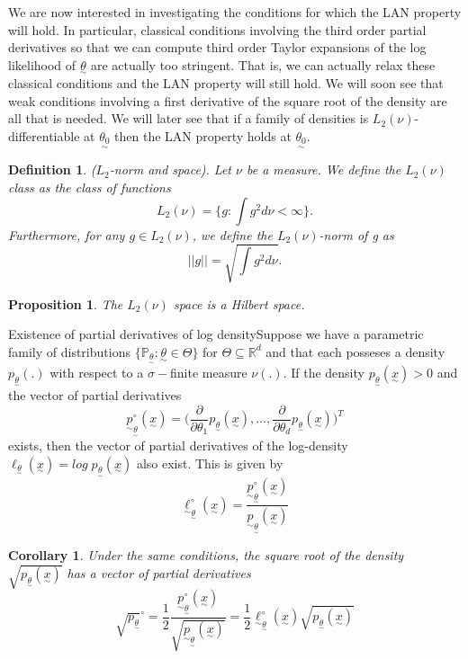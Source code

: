 \documentclass[twoside]{article}
\newtheorem{proposition}[theorem]{Proposition}
\newtheorem{corollary}[theorem]{Corollary}
\newtheorem{definition}[theorem]{Definition}
\newcommand{\prob}{\mathbb{P}}
\newcommand{\utilde}{\underset{\sim}}
\begin{document}
We are now interested in investigating the conditions for which the LAN property will hold. In particular, classical conditions involving the third order partial derivatives so that we can compute third order Taylor expansions of the log likelihood of $\utilde{\theta}$ are actually too stringent. That is, we can actually relax these classical conditions and the LAN property will still hold. We will soon see that weak conditions involving a first derivative of the square root of the density are all that is needed. We will later see that if a family of densities is $L_2(\nu)$-differentiable at $\utilde{\theta_0}$ then the LAN property holds at $\utilde{\theta_0}.$

\begin{definition}($L_2$-norm and space). Let $\nu$ be a measure. We define the $L_2(\nu)$ class as the class of functions 
$$
L_2(\nu) = \{g: \int g^2d\nu < \infty\}.
$$
Furthermore, for any $g \in L_2(\nu)$, we define the $L_2(\nu)$-norm of g as 
$$
||g|| = \sqrt{\int g^2d\nu}.
$$
\end{definition}

\begin{proposition}The $L_2(\nu)$ space is a Hilbert space.
\end{proposition}



\begin{proposition_exam}{Existence of partial derivatives of log density}{}Suppose we have a parametric family of distributions $\{\prob_{ \utilde{\theta}}: \utilde{\theta} \in \Theta\}$ for $\Theta \subseteq \mathbb{R}^d$ and that each posseses a density $p_{\utilde{\theta}}(.)$ with respect to a $\sigma-$finite measure $\nu(.).$ If the density $p_{\utilde{\theta}}(\utilde{x}) > 0$ and the vector of partial derivatives 
$$
\utilde{p}_{\utilde{\theta}}^{\circ}(\utilde{x}) = \bigg(\frac{\partial}{\partial \theta_1}p_{\utilde{\theta}}(\utilde{x}),...,\frac{\partial}{\partial \theta_d}p_{\utilde{\theta}}(\utilde{x}) \bigg)^T
$$
exists, then the vector of partial derivatives of the log-density $\ell_{\utilde{\theta}}(\utilde{x}) = log\;p_{\utilde{\theta}}(\utilde{x})$ also exist. This is given by 
$$
\utilde{\ell}_{\utilde{\theta}}^{\circ}(\utilde{x}) = \frac{\utilde{p}_{\utilde{\theta}}^{\circ}(\utilde{x})}{\utilde{p}_{\utilde{\theta}}(\utilde{x})}
$$
\end{proposition_exam}

\begin{corollary}Under the same conditions, the square root of the density $\sqrt{p_{\utilde{\theta}}(\utilde{x})}$ has a vector of partial derivatives 
$$
\sqrt{p_{\utilde{\theta}}}^{\circ} = \frac{1}{2}\frac{\utilde{p}_{\utilde{\theta}}^{\circ}(\utilde{x})}{\sqrt{\utilde{p}_{\utilde{\theta}}(\utilde{x})}} = \frac{1}{2}\utilde{\ell}_{\utilde{\theta}}^{\circ}(\utilde{x})\sqrt{p_{\utilde{\theta}}(\utilde{x})}
$$
\end{corollary}
\end{document}
